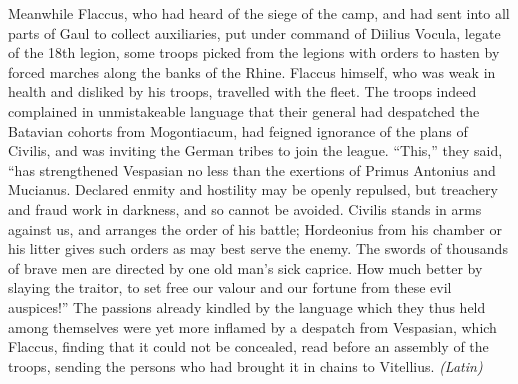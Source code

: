 Meanwhile Flaccus, who had heard of the siege of the camp, and had sent into all parts of Gaul to collect auxiliaries, put under command of Diilius Vocula, legate of the 18th legion, some troops picked from the legions with orders to hasten by forced marches along the banks of the Rhine. Flaccus himself, who was weak in health and disliked by his troops, travelled with the fleet. The troops indeed complained in unmistakeable language that their general had despatched the Batavian cohorts from Mogontiacum, had feigned ignorance of the plans of Civilis, and was inviting the German tribes to join the league. ``This,'' they said, ``has strengthened Vespasian no less than the exertions of Primus Antonius and Mucianus. Declared enmity and hostility may be openly repulsed, but treachery and fraud work in darkness, and so cannot be avoided. Civilis stands in arms against us, and arranges the order of his battle; Hordeonius from his chamber or his litter gives such orders as may best serve the enemy. The swords of thousands of brave men are directed by one old man's sick caprice. How much better by slaying the traitor, to set free our valour and our fortune from these evil auspices!'' The passions already kindled by the language which they thus held among themselves were yet more inflamed by a despatch from Vespasian, which Flaccus, finding that it could not be concealed, read before an assembly of the troops, sending the persons who had brought it in chains to Vitellius. \emph{(Latin)}


